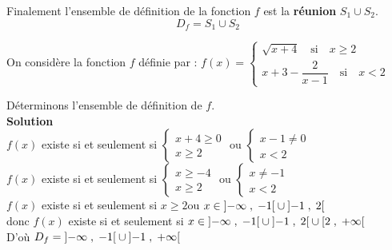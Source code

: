Finalement l'ensemble de définition  de la fonction $ f $ est la \textbf{réunion}  $S_{1}   \cup S_{2} $.
\[D_{f}=S_{1}   \cup S_{2}\]
\begin{example}
On considère la fonction $ f $ définie par :\;
$ f (x)=\left\{\begin{array}{l} \sqrt{x +4}\quad \textrm{si} \quad x\geq 2 \\ x+3-\dfrac{2}{x-1}\quad \textrm{si}\quad x< 2  \end{array} \right.$

 Déterminons  l'ensemble de définition de $f $.\\
 
\textbf{Solution}\\
$ f(x) $ existe si et seulement si  $ \begin{cases} x+4 \geq 0 \\ x\geq 2\end{cases}$  ou $ \begin{cases} x-1 \neq 0 \\ x< 2\end{cases}$\\
 $ f(x) $ existe si et seulement si  $ \begin{cases} x \geq -4 \\ x\geq 2\end{cases}$  ou $ \begin{cases} x\neq -1 \\ x< 2\end{cases}$\\
 $ f(x) $ existe si et seulement si   $ x \geq 2 $\quad  ou $ x\in \left]-\infty \;,\; -1\right[\cup \left]-1 \;,\; 2\right[ $ \\ donc $ f(x) $ existe si et seulement si  $ x\in\left]-\infty \;,\; -1\right[\cup \left]-1 \;,\; 2\right[ \cup\left[2 \;,\; +\infty\right[$ \\
 D'où $ D_{f}=\left]-\infty \;,\; -1\right[\cup \left]-1 \;,\; +\infty\right[$
 \end{example}

